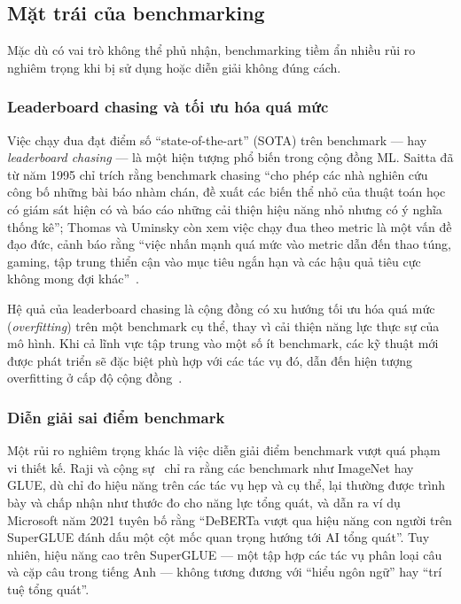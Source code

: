 \subsection{Mặt trái của benchmarking}

Mặc dù có vai trò không thể phủ nhận, benchmarking tiềm ẩn nhiều rủi ro nghiêm trọng khi bị sử dụng hoặc diễn giải không đúng cách.

\subsubsection{Leaderboard chasing và tối ưu hóa quá mức}

Việc chạy đua đạt điểm số ``state-of-the-art'' (SOTA) trên benchmark --- hay \textit{leaderboard chasing} --- là một hiện tượng phổ biến trong cộng đồng ML. Saitta đã từ năm 1995 chỉ trích rằng benchmark chasing ``cho phép các nhà nghiên cứu công bố những bài báo nhàm chán, đề xuất các biến thể nhỏ của thuật toán học có giám sát hiện có và báo cáo những cải thiện hiệu năng nhỏ nhưng có ý nghĩa thống kê''; Thomas và Uminsky còn xem việc chạy đua theo metric là một vấn đề đạo đức, cảnh báo rằng ``việc nhấn mạnh quá mức vào metric dẫn đến thao túng, gaming, tập trung thiển cận vào mục tiêu ngắn hạn và các hậu quả tiêu cực không mong đợi khác''~\cite{everything_benchmark}.

Hệ quả của leaderboard chasing là cộng đồng có xu hướng tối ưu hóa quá mức (\textit{overfitting}) trên một benchmark cụ thể, thay vì cải thiện năng lực thực sự của mô hình. Khi cả lĩnh vực tập trung vào một số ít benchmark, các kỹ thuật mới được phát triển sẽ đặc biệt phù hợp với các tác vụ đó, dẫn đến hiện tượng overfitting ở cấp độ cộng đồng~\cite{measuring_what_matters}.

\subsubsection{Diễn giải sai điểm benchmark}

Một rủi ro nghiêm trọng khác là việc diễn giải điểm benchmark vượt quá phạm vi thiết kế. Raji và cộng sự~\cite{everything_benchmark} chỉ ra rằng các benchmark như ImageNet hay GLUE, dù chỉ đo hiệu năng trên các tác vụ hẹp và cụ thể, lại thường được trình bày và chấp nhận như thước đo cho năng lực tổng quát, và dẫn ra ví dụ Microsoft năm 2021 tuyên bố rằng ``DeBERTa vượt qua hiệu năng con người trên SuperGLUE đánh dấu một cột mốc quan trọng hướng tới AI tổng quát''. Tuy nhiên, hiệu năng cao trên SuperGLUE --- một tập hợp các tác vụ phân loại câu và cặp câu trong tiếng Anh --- không tương đương với ``hiểu ngôn ngữ'' hay ``trí tuệ tổng quát''.

